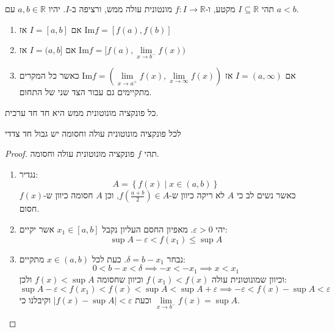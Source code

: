\documentclass{tstextbook}
\begin{document}
\begin{proposition}
תהי \(I\subseteq \mathbb{R}\) מקטע, ו-\(f:I\to \mathbb{R}\) מונטונית עולה ממש, ורציפה ב-\(I\). יהיו \(a,b \in \mathbb{R}\) עם \(a< b\).

  \begin{enumerate}
    \item אם \(I=[a,b]\) אז \(\mathrm{Im}f=[f(a),f(b)]\)


    \item אם \(I=(a,b]\) אז \(\mathrm{Im}f=[ f(a),\underset{ x \to b^{-} }{\lim }f(x) )\)


    \item אם \(I=\left( a,\infty \right)\) אז \(\mathrm{Im}f=\left( \underset{ x \to a^{+} }{\lim }f(x),\underset{ x \to \infty }{\lim }f(x) \right)\) 
כאשר כל המקרים מתקיימים גם עבור הצד שני של התחום.


  \end{enumerate}
\end{proposition}
\begin{proposition}
כל פונקציה מונוטונית ממש היא חד חד ערכית.

\end{proposition}
\begin{proposition}
לכל פונקציה מונוטונית עולה וחסומה יש גבול חד צדדי

\end{proposition}
\begin{proof}
תהי \(f\) פונקציה מונוטונית עולה וחסומה.

  \begin{enumerate}
    \item נגדיר: 
$$A=\left\{  f(x)\mid x \in (a,b)  \right\}$$
כאשר נשים לב כי \(A\) לא ריקה כיוון ש-\(f\left( \frac{a+b}{2} \right)\in A\), וכן \(A\) חסומה כיוון ש-\(f(x)\) חסום.


    \item יהי \(\varepsilon> 0\). מאפיון החסם העליון נקבל \(x_{1} \in [a,b]\) אשר יקיים: 
$$\sup A-\varepsilon < f(x_{1})\leq \sup  A$$


    \item נבחר \(\delta=b-x_{1}\). כעת לכל \(x \in (a,b)\) מתקיים: 
$$0<b-x<\delta\implies -x<-x_{1}\implies x< x_{1}$$
וכיוון שמונוטונית עולה \(f(x_{1})<f(x)\) וכיוון שחסומה \(f(x)<\sup A\) ולכן:
$$\sup  A-\varepsilon < f(x_{1}) < f(x)< \sup  A< \sup  A+\varepsilon\implies-\varepsilon<f(x)-\sup  A<\varepsilon$$
וכעת \(\left\lvert  f(x)-\sup A  \right\rvert<\varepsilon\) וקיבלנו כי \(\underset{ x \to b^{-} }{\lim }f(x)=\sup A\).


  \end{enumerate}
\end{proof}
\end{document}

